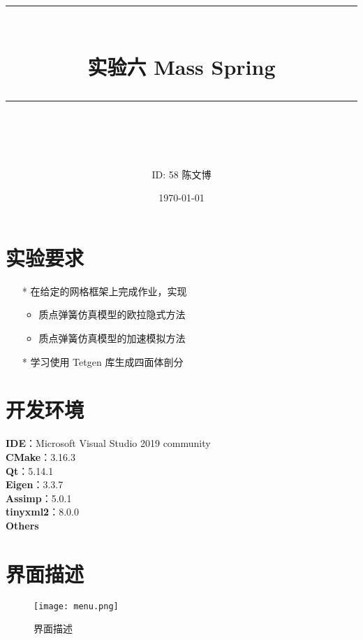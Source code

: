 \documentclass[14pt]{scrartcl} %
\title{	
	\normalfont\normalsize
	\rule{\linewidth}{0.5pt}\\ %
	\vspace{20pt} %
	{\huge 实验六	Mass Spring}\\ %
	\vspace{12pt} %
	\rule{\linewidth}{2pt}\\ %
	\vspace{12pt} %
}
\author{\LARGE ID: 58		陈文博} %
\date{\normalsize\today} %
\begin{document}
\maketitle %


\section{实验要求}


\begin{itemize}
	\item[*] 在给定的网格框架上完成作业，实现
	\begin{itemize}
		\item 质点弹簧仿真模型的欧拉隐式方法
		\item 质点弹簧仿真模型的加速模拟方法
	\end{itemize}
	\item[*] 学习使用 Tetgen 库生成四面体剖分
\end{itemize}


\section{开发环境}

\textbf{IDE}：Microsoft Visual Studio 2019 community\\
\textbf{CMake}：3.16.3\\
\textbf{Qt}：5.14.1\\
\textbf{Eigen}：3.3.7\\
\textbf{Assimp}：5.0.1\\
\textbf{tinyxml2}：8.0.0\\
\textbf{Others}

\section{界面描述}
\begin{figure}[h] %
	\centering
	\texttt{[image: menu.png]} %
	\caption{界面描述}
\end{figure}
\end{document}
